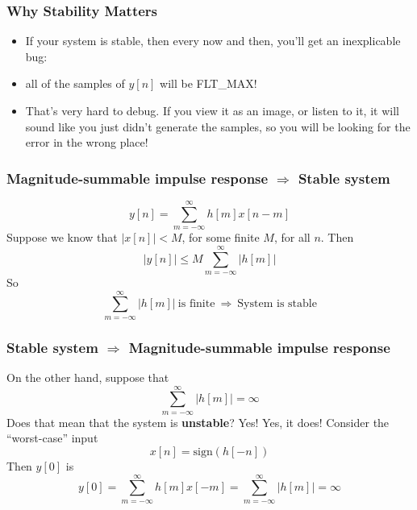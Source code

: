 \documentclass{beamer}
\begin{document}
\begin{frame}
  \frametitle{Why Stability Matters}

  \begin{itemize}
  \item If your system is stable, then every now and then, you'll
    get an inexplicable bug:
  \item all of the samples of $y[n]$ will be FLT\_MAX!
  \item That's very hard to debug.  If you view it as an image, or
    listen to it, it will sound like you just didn't generate the
    samples, so you will be looking for the error in the wrong place!
  \end{itemize}
    
\end{frame}

\begin{frame}
  \frametitle{Magnitude-summable impulse response $\Rightarrow$ Stable system}

  \begin{displaymath}
    y[n] = \sum_{m=-\infty}^\infty h[m] x[n-m]
  \end{displaymath}
  Suppose we know that $|x[n]|<M$, for some finite $M$, for all $n$.  Then
  \begin{displaymath}
    |y[n]| \le  M \sum_{m=-\infty}^\infty |h[m]|
  \end{displaymath}
  So
  \begin{displaymath}
    \sum_{m=-\infty}^\infty |h[m]|~\mbox{is finite}~\Rightarrow~\mbox{System is stable}
  \end{displaymath}
\end{frame}

\begin{frame}
  \frametitle{Stable system $\Rightarrow$ Magnitude-summable impulse response}

  On the other hand, suppose that 
  \begin{displaymath}
    \sum_{m=-\infty}^\infty |h[m]|=\infty
  \end{displaymath}
  Does that mean that the system is {\bf unstable}?  Yes!  Yes, it
  does!  Consider the ``worst-case'' input
  \begin{displaymath}
    x[n] = \mbox{sign}\left(h[-n]\right)
  \end{displaymath}
  Then $y[0]$ is
  \begin{displaymath}
    y[0] = \sum_{m=-\infty}^\infty h[m] x[-m] = \sum_{m=-\infty}^\infty |h[m]|=\infty
  \end{displaymath}
\end{frame}
\end{document}
